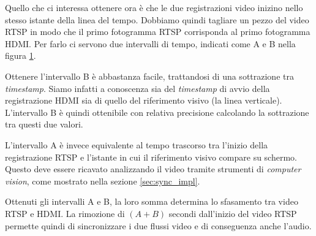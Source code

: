 Quello che ci interessa ottenere ora è che le due registrazioni video inizino nello stesso istante della linea del tempo. Dobbiamo quindi tagliare un pezzo del video RTSP in modo che il primo fotogramma RTSP corrisponda al primo fotogramma HDMI. Per farlo ci servono due intervalli di tempo, indicati come A e B nella figura \ref{fig:sync2}.

\begin{figure}[H]
	\centering
	
	
	\caption{}
	\label{fig:sync2}
\end{figure}

Ottenere l'intervallo B è abbastanza facile, trattandosi di una sottrazione tra \emph{timestamp}. Siamo infatti a conoscenza sia del \emph{timestamp} di avvio della registrazione HDMI sia di quello del riferimento visivo (la linea verticale). L'intervallo B è quindi ottenibile con relativa precisione calcolando la sottrazione tra questi due valori.

L'intervallo A è invece equivalente al tempo trascorso tra l'inizio della registrazione RTSP e l'istante in cui il riferimento visivo compare su schermo. Questo deve essere ricavato analizzando il video tramite strumenti di \emph{computer vision}, come mostrato nella sezione \ref{sec:sync_impl}.

Ottenuti gli intervalli A e B, la loro somma determina lo sfasamento tra video RTSP e HDMI. La rimozione di $(A+B)$ secondi dall'inizio del video RTSP permette quindi di sincronizzare i due flussi video e di conseguenza anche l'audio.

